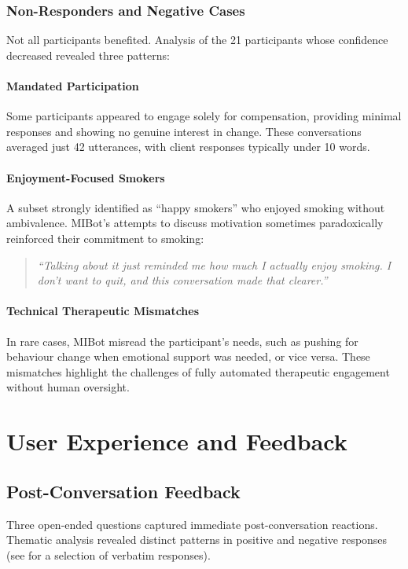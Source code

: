 \subsubsection{Non-Responders and Negative Cases}

Not all participants benefited. Analysis of the 21 participants whose confidence decreased revealed three patterns:

\paragraph{Mandated Participation}
Some participants appeared to engage solely for compensation, providing minimal responses and showing no genuine interest in change. These conversations averaged just 42 utterances, with client responses typically under 10 words.

\paragraph{Enjoyment-Focused Smokers}
A subset strongly identified as ``happy smokers'' who enjoyed smoking without ambivalence. MIBot's attempts to discuss motivation sometimes paradoxically reinforced their commitment to smoking:

\begin{quote}
	\textit{``Talking about it just reminded me how much I actually enjoy smoking. I don't want to quit, and this conversation made that clearer.''}
\end{quote}

\paragraph{Technical Therapeutic Mismatches}
In rare cases, MIBot misread the participant's needs, such as pushing for behaviour change when emotional support was needed, or vice versa. These mismatches highlight the challenges of fully automated therapeutic engagement without human oversight.

\section{User Experience and Feedback}
\label{sec:feedback}

\subsection*{Post-Conversation Feedback}

Three open-ended questions captured immediate post-conversation reactions. Thematic analysis revealed distinct patterns in positive and negative responses (see  for a selection of verbatim responses).

